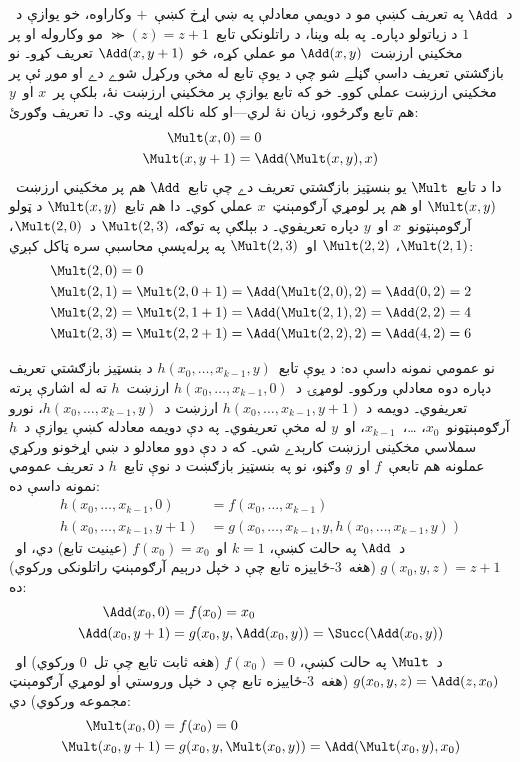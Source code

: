 \documentclass[../../../include/open-logic-section]{subfiles}
\begin{document}
د~$\Add$ په تعريف کښې مو د دويمې معادلې په ښي اړخ کښې~$+$ وکاراوه،
خو يوازې د~$1$ د زياتولو دپاره۔ په بله وينا، د راتلونکي
تابع~$\Succ(z) = z+1$ مو وکاروله او پر مخکيني ارزښت~$\Add(x,y)$ مو
عملي کړه، څو~$\Add(x,y+1)$ تعريف کړو۔ نو بازګشتي تعريف داسې ګڼلے شو
چې د يوې تابع له مخې ورکړل شوے دے او موږ ئې پر مخکيني ارزښت عملي
کوو۔ خو که تابع يوازې پر مخکيني ارزښت نۀ، بلکې پر~$x$ او~$y$ هم
تابع وګرځوو، زيان نۀ لري---او کله ناکله اړينه وي۔ دا تعريف وګورئ:
\begin{align*}
  \Mult(x,0) & =  0 \\
  \Mult(x,y+1) & =  \Add(\Mult(x,y),x)
\end{align*}
دا د تابع~$\Mult$ يو بنسټيز بازګشتي تعريف دے چې تابع~$\Add$ هم پر
مخکيني ارزښت~$\Mult(x,y)$ او هم پر لومړي آرګومېنټ~$x$ عملي کوي۔
دا هم تابع~$\Mult(x,y)$ د ټولو آرګومېنټونو~$x$ او~$y$ دپاره
تعريفوي۔ د بېلګې په توګه، $\Mult(2,3)$ د~$\Mult(2,0)$،
$\Mult(2,1)$، $\Mult(2,2)$ او~$\Mult(2,3)$ په پرله‌پسې محاسبې
سره ټاکل کېږي:
\begin{align*}
  \Mult(2,0) & = 0\\
  \Mult(2,1) & = \Mult(2,0+1) =
  \Add(\Mult(2,0), 2) = \Add(0, 2) = 2\\
  \Mult(2,2) & = \Mult(2,1+1) =
  \Add(\Mult(2,1), 2) = \Add(2, 2) = 4\\
  \Mult(2,3) & = \Mult(2,2+1) =
  \Add(\Mult(2,2), 2) = \Add(4, 2) = 6
\end{align*}

نو عمومي نمونه داسې ده: د يوې تابع~$h(x_0, \dots, x_{k-1}, y)$
د بنسټيز بازګشتي تعريف دپاره دوه معادلې ورکوو۔ لومړۍ د~$h(x_0,
\dots, x_{k-1}, 0)$ ارزښت~$h$ ته له اشارې پرته تعريفوي۔ دويمه د
$h(x_0, \dots, x_{k-1}, y+1)$ ارزښت د~$h(x_0, \dots,
x_{k-1}, y)$، نورو آرګومېنټونو~$x_0$، \dots،~$x_{k-1}$، او~$y$
له مخې تعريفوي۔ په دې دويمه معادله کښې يوازې د~$h$ سملاسي مخکينی
ارزښت کارېدے شي۔ که د دې دوو معادلو د ښي اړخونو ورکړي عملونه هم
تابعې~$f$ او~$g$ وګڼو، نو په بنسټيز بازګښت د نوې تابع~$h$ د تعريف
عمومي نمونه داسې ده:
\begin{align*}
  h(x_0, \dots, x_{k-1}, 0) & = f(x_0, \dots, x_{k-1})\\
  h(x_0, \dots, x_{k-1}, y+1) & =
  g(x_0, \dots, x_{k-1}, y, h(x_0, \dots, x_{k-1}, y))
\end{align*}
د~$\Add$ په حالت کښې، $k=1$ او~$f(x_0) = x_0$ (عينيت تابع) دي،
او~$g(x_0, y, z) = z + 1$ (هغه~$3$-ځاييزه تابع چې د خپل درېيم
آرګومېنټ راتلونکی ورکوي) ده:
\begin{align*}
  \Add(x_0, 0) & = f(x_0) = x_0\\
  \Add(x_0, y+1) & = g(x_0, y, \Add(x_0, y)) =
  \Succ(\Add(x_0, y))
\end{align*}
د~$\Mult$ په حالت کښې، $f(x_0) = 0$ (هغه ثابت تابع چې تل~$0$
ورکوي) او~$g(x_0, y, z) = \Add(z,x_0)$ (هغه~$3$-ځاييزه تابع چې د
خپل وروستي او لومړي آرګومېنټ مجموعه ورکوي) دي:
\begin{align*}
  \Mult(x_0,0) & =  f(x_0) = 0 \\
  \Mult(x_0,y+1) & =  g(x_0, y, \Mult(x_0,y)) =
  \Add(\Mult(x_0,y), x_0)
\end{align*}
\end{document}
